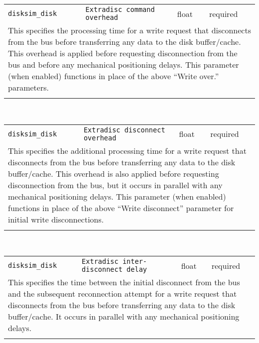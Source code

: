 \noindent 
\begin{tabular}{|p{1.5in}|p{3.5in}|p{0.5in}|p{0.5in}|}
\cline{1-4}
\texttt{disksim\_disk} & \texttt{Extradisc command overhead} & float & required \\ 
\cline{1-4}
\multicolumn{4}{|p{6in}|}{
This specifies the processing time for a write request that disconnects
from the bus before transferring any data to the disk buffer/cache.
This overhead is applied before requesting disconnection from the bus
and before any mechanical positioning delays. This parameter (when
enabled) functions in place of the above ``Write over.'' parameters.
}\\ 
\cline{1-4}
\multicolumn{4}{p{5in}}{}\\
\end{tabular}\\ 
\noindent 
\begin{tabular}{|p{1.5in}|p{3.5in}|p{0.5in}|p{0.5in}|}
\cline{1-4}
\texttt{disksim\_disk} & \texttt{Extradisc disconnect overhead} & float & required \\ 
\cline{1-4}
\multicolumn{4}{|p{6in}|}{
This specifies the additional processing time for a write request that
disconnects from the bus before transferring any data to the disk
buffer/cache. This overhead is also applied before requesting
disconnection from the bus, but it occurs in parallel with any
mechanical positioning delays. This parameter (when enabled)
functions in place of the above ``Write disconnect'' parameter for
initial write disconnections.
}\\ 
\cline{1-4}
\multicolumn{4}{p{5in}}{}\\
\end{tabular}\\ 
\noindent 
\begin{tabular}{|p{1.5in}|p{3.5in}|p{0.5in}|p{0.5in}|}
\cline{1-4}
\texttt{disksim\_disk} & \texttt{Extradisc inter-disconnect delay} & float & required \\ 
\cline{1-4}
\multicolumn{4}{|p{6in}|}{
This specifies the time between the initial disconnect from the bus and
the subsequent reconnection attempt for a write request that
disconnects from the bus before transferring any data to the disk
buffer/cache. It occurs in parallel with any mechanical positioning
delays.
}\\ 
\cline{1-4}
\multicolumn{4}{p{5in}}{}\\
\end{tabular}\\ 
\noindent 
